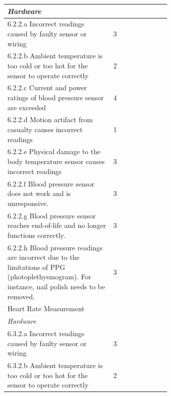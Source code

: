 \documentclass{article}
\begin{document}
\begin{longtable}{|p{0.65\linewidth}|l|}
\hline
\textit{Hardware}                                                  &                     \\
\hline
6.2.2.a Incorrect readings caused by faulty sensor or wiring                                                                                                        & 3                   \\
\hline
6.2.2.b Ambient temperature is too cold or too hot for the sensor to operate correctly                                                                             & 2                   \\
\hline
6.2.2.c Current and power ratings of blood pressure sensor are exceeded                                                                                            & 4                   \\
\hline
6.2.2.d Motion artifact from casualty causes incorrect readings                                                                                                    & 1                   \\
\hline
6.2.2.e Physical damage to the body temperature sensor causes incorrect readings                                                                                   & 3                   \\
\hline
6.2.2.f Blood pressure sensor does not work and is unresponsive.                                                                                                   & 3                   \\
\hline
6.2.2.g Blood pressure sensor reaches end-of-life and no longer functions correctly.                                                                               & 3                   \\
\hline
6.2.2.h Blood pressure readings are incorrect due to the limitations of PPG (photoplethysmogram).
For instance, nail polish needs to be removed.                   & 3                   \\
\hline   
\rowcolor{Gray}
Heart Rate Measurement                                             &                     \\
\hline
\textit{Hardware}                                                  &                     \\
\hline
6.3.2.a Incorrect readings caused by faulty sensor or wiring     & 3                   \\
\hline
6.3.2.b Ambient temperature is too cold or too hot for the sensor to operate correctly                                                                             & 2                   \\

\end{longtable}
\end{document}
